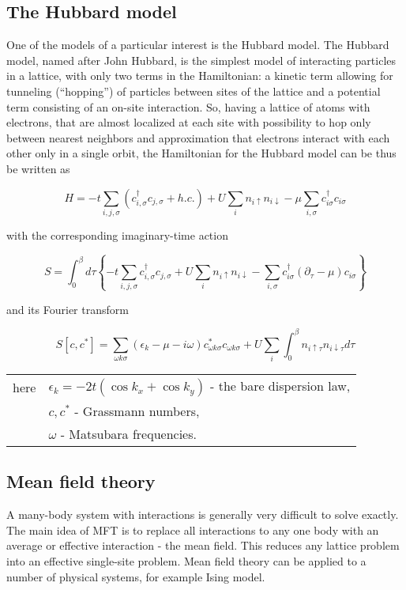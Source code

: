 \subsection{The Hubbard model}\label{sec:hubbard}
One of the models of a particular interest is the Hubbard model.
The Hubbard model, named after John Hubbard, is the simplest model of interacting particles in a lattice,
 with only two terms in the Hamiltonian: a kinetic term allowing for tunneling (``hopping'') of particles between sites of the lattice 
 and a potential term consisting of an on-site interaction.
So, having a lattice of atoms with electrons, that are almost localized at each site with possibility to hop
only between nearest neighbors and approximation that electrons interact with each other only in a single orbit, 
the Hamiltonian for the Hubbard model can be thus be written as

\begin{equation} 
  H = -t \sum_{i,j,\sigma}(c_{i,\sigma}^\dagger c_{j,\sigma} + h.c.)+ U\sum_i n_{i\uparrow}n_{i\downarrow} - \mu\sum_{i,\sigma}c_{i\sigma}^\dagger c_{i\sigma} 
\end{equation}

with the corresponding imaginary-time action

\begin{equation} S = \int_0^\beta d\tau \left\{
  -t \sum_{i,j,\sigma}c_{i,\sigma}^\dagger c_{j,\sigma} + U\sum_i n_{i\uparrow}n_{i\downarrow} - \sum_{i,\sigma}c_{i\sigma}^\dagger (\partial_\tau-\mu) c_{i\sigma} \right\} \end{equation}

and its Fourier transform

\begin{equation} S[c,c^*] = \sum_{\omega k \sigma}(\epsilon_k-\mu-i\omega)c_{\omega k \sigma}^* c_{\omega k \sigma} + U\sum_i\int_0^\beta n_{i\uparrow\tau}n_{i\downarrow\tau} d\tau \end{equation}
 
\begin{tabular}{rl}
  here & $\epsilon_k = -2t(\cos{k_x}+\cos{k_y})$ - the bare dispersion law, \\
  & $c,c^*$ - Grassmann numbers, \\
  & $\omega$ - Matsubara frequencies.
\end{tabular}

\subsection{Mean field theory}
A many-body system with interactions is generally very difficult to solve exactly.
The main idea of MFT is to replace all interactions to any one body with an average or effective interaction - the mean field.
This reduces any lattice problem into an effective single-site problem.
Mean field theory can be applied to a number of physical systems, for example Ising model.

